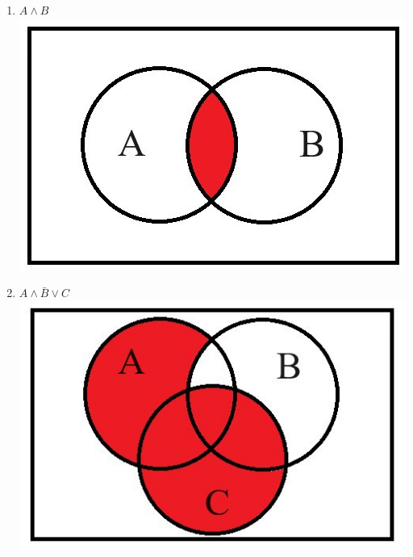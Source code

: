     \begin{minipage}[t]{0.4\textwidth}
        \centering
        \begin{enumerate}
            \item $A \wedge B$\\
            \includegraphics[width=1\linewidth]{images/img_2}

            \item $A \wedge \bar B \vee C$\\
            \includegraphics[width=1\linewidth]{images/img_3}
        \end{enumerate}
    \end{minipage}
